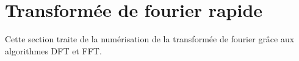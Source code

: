 

\section{Transformée de fourier rapide}
Cette section traite de la numérisation de la transformée de fourier grâce aux algorithmes DFT et FFT. \cite{dft-fft}
